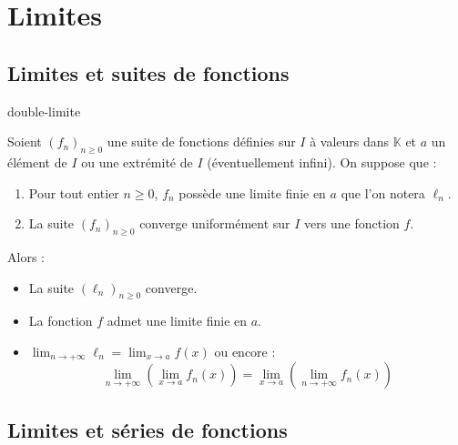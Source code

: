 \documentclass[french,11pt,twoside]{VcCours}
\begin{document}
\section{Limites}
\subsection{Limites et suites de fonctions}

\begin{Theoreme}{double-limite}

Soient $(f_n)_{n \geq 0}$ une suite de fonctions définies sur $I$ à valeurs dans $\mathbb{K}$ et $a$ un élément de $I$ ou une extrémité de $I$ (éventuellement infini). On suppose que :

\begin{enumerate}
\item Pour tout entier $n \geq 0$, $f_n$ possède une limite finie en $a$ que l'on notera $\ell_n$.
\item La suite $(f_n)_{n \geq 0}$ converge uniformément sur $I$ vers une fonction $f$.
\end{enumerate}
Alors :

\begin{itemize}
\item La suite $(\ell_n)_{n \geq 0}$ converge.
\item La fonction $f$ admet une limite finie en $a$.
\item $\lim_{n \rightarrow + \infty} \ell_n = \lim_{x \rightarrow a } f(x)$ ou encore :
$$ \lim_{n \rightarrow + \infty} \left( \lim_{x \rightarrow a} f_n(x) \right)=  \lim_{x \rightarrow a} \left(\lim_{n \rightarrow + \infty} f_n(x)\right)$$
\end{itemize}
\end{Theoreme}

\subsection{Limites et séries de fonctions}
\end{document}
